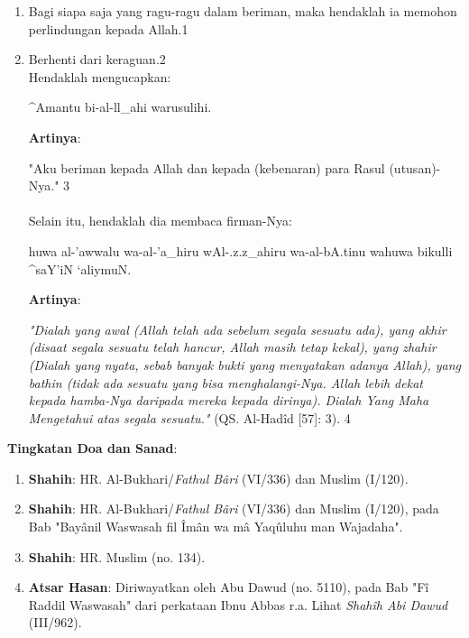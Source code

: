 \documentclass[a4paper,12pt]{article}
\begin{document}
\begin{enumerate}
\item Bagi siapa saja yang ragu-ragu dalam beriman, maka hendaklah ia 
memohon perlindungan kepada Allah.{\scriptsize 1}
\item Berhenti dari keraguan.{\scriptsize 2}\\
\indent Hendaklah mengucapkan:\\
\begin{arabtext}
\noindent
^Amantu bi-al-ll_ahi warusulihi.\\
\end{arabtext}
\noindent
\textbf{Artinya}:
\par
\indent
"Aku beriman kepada Allah dan kepada (kebenaran) para Rasul (utusan)-Nya."
{\scriptsize 3}\\\\
\indent
Selain itu, hendaklah dia membaca firman-Nya: 
\begin{arabtext}
\noindent
huwa al-'awwalu wa-al-'a_hiru wAl-.z.z_ahiru wa-al-bA.tinu wahuwa bikulli 
^saY'iN `aliymuN.\\
\end{arabtext}
\noindent
\textbf{Artinya}:
\par
\indent
\textit{"Dialah yang awal (Allah telah ada sebelum segala sesuatu ada), 
yang akhir (disaat segala sesuatu telah hancur, Allah masih tetap kekal), 
yang zhahir (Dialah yang nyata, sebab banyak bukti yang menyatakan adanya 
Allah), yang bathin (tidak ada sesuatu yang bisa menghalangi-Nya. Allah 
lebih dekat kepada hamba-Nya daripada mereka kepada dirinya). Dialah Yang 
Maha Mengetahui atas segala sesuatu."} (QS. Al-Had\^{i}d [57]: 3).
{\scriptsize 4}\\
\end{enumerate}
\par
\noindent
\textbf{Tingkatan Doa dan Sanad}:
\begin{enumerate}
\item \textbf{Shahih}: HR. Al-Bukhari/\textit{Fathul B\^{a}ri} (VI/336) dan
Muslim (I/120).
\item \textbf{Shahih}: HR. Al-Bukhari/\textit{Fathul B\^{a}ri} (VI/336) dan
Muslim (I/120), pada Bab "Bay\^{a}nil Waswasah fil \^{I}m\^{a}n wa m\^{a} 
Yaq\^{u}luhu man Wajadaha".
\item \textbf{Shahih}: HR. Muslim (no. 134).
\item \textbf{Atsar Hasan}: Diriwayatkan oleh Abu Dawud (no. 5110), pada 
Bab "F\^{i} Raddil Waswasah" dari perkataan Ibnu Abbas r.a. Lihat 
\textit{Shah\^{i}h Abi Dawud} (III/962).\\\\
\end{enumerate}
\end{document}
